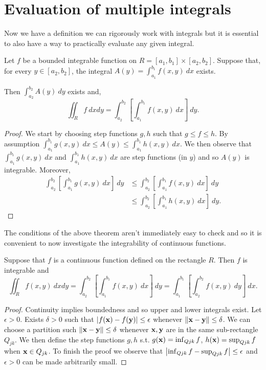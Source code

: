 \section{Evaluation of multiple integrals}

Now we have a definition we can rigorously work with integrals but it is essential to also have a way to practically evaluate any given integral.
%
\begin{theorem*}
    Let \(f\) be a bounded integrable function on  \(R = [a_1,b_1] \times [a_2,b_2]\).
    Suppose that, for every \(y\in [a_2,b_2]\), the integral \( A(y) = \int_{a_1}^{b_1} f(x,y) \ dx \) exists.

    Then \(\int_{a_2}^{b_2} A(y) \ dy\) exists and,
    \[
        \iint_{R} f \ dxdy = \int_{a_2}^{b_2} \left[ \int_{a_1}^{b_1} f(x,y) \ dx  \right] \ dy.
    \]
\end{theorem*}

\begin{proof}
    We start by choosing step functions \(g,h\) such that \(g\leq f \leq h\).
    By assumption \(\int_{a_1}^{b_1} g(x,y) \ dx \leq A(y) \leq \int_{a_1}^{b_1} h(x,y) \ dx\).
    We then observe that \(\int_{a_1}^{b_1} g(x,y) \ dx \) and \(\int_{a_1}^{b_1} h(x,y) \ dx\) are step functions (in \(y\)) and so \(A(y)\) is integrable.
    Moreover,
    \[
        \begin{aligned}
            \int_{a_2}^{b_2} \left[ \int_{a_1}^{b_1} g(x,y) \ dx  \right] \ dy
             & \leq \int_{a_2}^{b_2} \left[ \int_{a_1}^{b_1} f(x,y) \ dx  \right] \ dy  \\
             & \leq \int_{a_2}^{b_2} \left[ \int_{a_1}^{b_1} h(x,y) \ dx  \right] \ dy.
        \end{aligned}
    \]
\end{proof}
%
The conditions of the above theorem aren't immediately easy to check and so it is convenient to now investigate the integrability of continuous functions.
%
\begin{theorem}
    Suppose that \(f\) is a continuous function defined on the rectangle \(R\).
    Then \(f\) is integrable and
    \[
        \iint_{R} f(x,y) \ dxdy
        = \int_{a_2}^{b_2} \left[ \int_{a_1}^{b_1} f(x,y) \ dx  \right] \ dy
        = \int_{a_1}^{b_1} \left[\int_{a_2}^{b_2}  f(x,y) \ dy  \right] \ dx.
    \]
\end{theorem}
%
\begin{proof}
    Continuity implies boundedness and so upper and lower integrals exist.
    Let \(\epsilon>0\). Exists \(\delta>0\) such that \(\left|f(\mathbf{x})-f(\mathbf{y})\right|\leq \epsilon\) whenever \(\left\|\mathbf{x}-\mathbf{y}\right\|\leq \delta\).
    We can choose a partition such  \(\left\|\mathbf{x}-\mathbf{y}\right\|\leq \delta\) whenever \(\mathbf{x},\mathbf{y}\) are in the same sub-rectangle \(Q_{jk}\).
    We then define the step functions \(g,h\) s.t. \(g(\mathbf{x})=\inf_{Q{jk}} f\),   \(h(\mathbf{x})=\sup_{Q{jk}} f\) when \(\mathbf{x}\in Q_{jk}\).
    To finish the proof we observe that \(\left|\inf_{Q{jk}} f - \sup_{Q{jk}} f \right|\leq \epsilon\) and \(\epsilon>0\) can be made arbitrarily small.
\end{proof}

